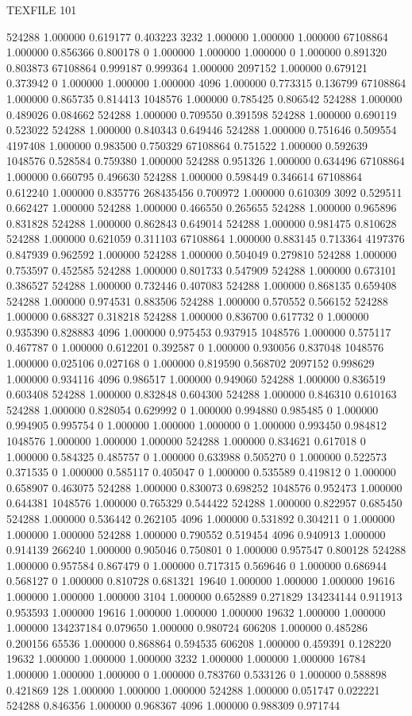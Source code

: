 TEXFILE
101

524288 1.000000 0.619177 0.403223
3232 1.000000 1.000000 1.000000
67108864 1.000000 0.856366 0.800178
0 1.000000 1.000000 1.000000
0 1.000000 0.891320 0.803873
67108864 0.999187 0.999364 1.000000
2097152 1.000000 0.679121 0.373942
0 1.000000 1.000000 1.000000
4096 1.000000 0.773315 0.136799
67108864 1.000000 0.865735 0.814413
1048576 1.000000 0.785425 0.806542
524288 1.000000 0.489026 0.084662
524288 1.000000 0.709550 0.391598
524288 1.000000 0.690119 0.523022
524288 1.000000 0.840343 0.649446
524288 1.000000 0.751646 0.509554
4197408 1.000000 0.983500 0.750329
67108864 0.751522 1.000000 0.592639
1048576 0.528584 0.759380 1.000000
524288 0.951326 1.000000 0.634496
67108864 1.000000 0.660795 0.496630
524288 1.000000 0.598449 0.346614
67108864 0.612240 1.000000 0.835776
268435456 0.700972 1.000000 0.610309
3092 0.529511 0.662427 1.000000
524288 1.000000 0.466550 0.265655
524288 1.000000 0.965896 0.831828
524288 1.000000 0.862843 0.649014
524288 1.000000 0.981475 0.810628
524288 1.000000 0.621059 0.311103
67108864 1.000000 0.883145 0.713364
4197376 0.847939 0.962592 1.000000
524288 1.000000 0.504049 0.279810
524288 1.000000 0.753597 0.452585
524288 1.000000 0.801733 0.547909
524288 1.000000 0.673101 0.386527
524288 1.000000 0.732446 0.407083
524288 1.000000 0.868135 0.659408
524288 1.000000 0.974531 0.883506
524288 1.000000 0.570552 0.566152
524288 1.000000 0.688327 0.318218
524288 1.000000 0.836700 0.617732
0 1.000000 0.935390 0.828883
4096 1.000000 0.975453 0.937915
1048576 1.000000 0.575117 0.467787
0 1.000000 0.612201 0.392587
0 1.000000 0.930056 0.837048
1048576 1.000000 0.025106 0.027168
0 1.000000 0.819590 0.568702
2097152 0.998629 1.000000 0.934116
4096 0.986517 1.000000 0.949060
524288 1.000000 0.836519 0.603408
524288 1.000000 0.832848 0.604300
524288 1.000000 0.846310 0.610163
524288 1.000000 0.828054 0.629992
0 1.000000 0.994880 0.985485
0 1.000000 0.994905 0.995754
0 1.000000 1.000000 1.000000
0 1.000000 0.993450 0.984812
1048576 1.000000 1.000000 1.000000
524288 1.000000 0.834621 0.617018
0 1.000000 0.584325 0.485757
0 1.000000 0.633988 0.505270
0 1.000000 0.522573 0.371535
0 1.000000 0.585117 0.405047
0 1.000000 0.535589 0.419812
0 1.000000 0.658907 0.463075
524288 1.000000 0.830073 0.698252
1048576 0.952473 1.000000 0.644381
1048576 1.000000 0.765329 0.544422
524288 1.000000 0.822957 0.685450
524288 1.000000 0.536442 0.262105
4096 1.000000 0.531892 0.304211
0 1.000000 1.000000 1.000000
524288 1.000000 0.790552 0.519454
4096 0.940913 1.000000 0.914139
266240 1.000000 0.905046 0.750801
0 1.000000 0.957547 0.800128
524288 1.000000 0.957584 0.867479
0 1.000000 0.717315 0.569646
0 1.000000 0.686944 0.568127
0 1.000000 0.810728 0.681321
19640 1.000000 1.000000 1.000000
19616 1.000000 1.000000 1.000000
3104 1.000000 0.652889 0.271829
134234144 0.911913 0.953593 1.000000
19616 1.000000 1.000000 1.000000
19632 1.000000 1.000000 1.000000
134237184 0.079650 1.000000 0.980724
606208 1.000000 0.485286 0.200156
65536 1.000000 0.868864 0.594535
606208 1.000000 0.459391 0.128220
19632 1.000000 1.000000 1.000000
3232 1.000000 1.000000 1.000000
16784 1.000000 1.000000 1.000000
0 1.000000 0.783760 0.533126
0 1.000000 0.588898 0.421869
128 1.000000 1.000000 1.000000
524288 1.000000 0.051747 0.022221
524288 0.846356 1.000000 0.968367
4096 1.000000 0.988309 0.971744